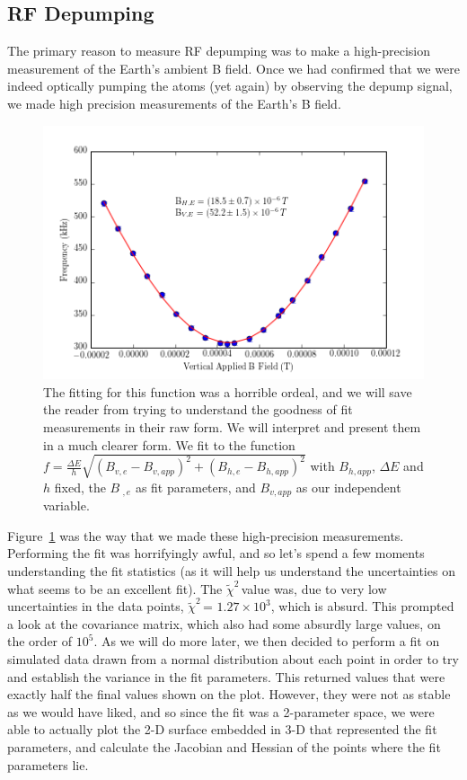\documentclass{article}
\newcommand{\redchi}{$\tilde{\chi}^2\,$}
\begin{document}
    \hspace{.25cm}

  \subsection{RF Depumping}
    The primary reason to measure RF depumping was to make a high-precision measurement of the Earth's ambient B field.  Once we had confirmed that we were indeed optically pumping the atoms (yet again) by observing the depump signal, we made high precision measurements of the Earth's B field.

    \begin{figure}[!htb]
      \centering
      \includegraphics[scale=.7]{../plots/earth_field.png}
      \caption{The fitting for this function was a horrible ordeal, and we will save the reader from trying to understand the goodness of fit measurements in their raw form.  We will interpret and present them in a much clearer form.  We fit to the function $f = \frac{\Delta E}{h}\sqrt{(B_{v,e} - B_{v,app})^2 + (B_{h,e} - B_{h,app})^2}$ with $B_{h,app}$, $\Delta E$ and $h$ fixed, the $B_{\,\,,e}$ as fit parameters, and $B_{v,app}$ as our independent variable.}
      \label{earth_field}
    \end{figure}

    Figure~\ref{earth_field} was the way that we made these high-precision measurements.  Performing the fit was horrifyingly awful, and so let's spend a few moments understanding the fit statistics (as it will help us understand the uncertainties on what seems to be an excellent fit).  The \redchi value was, due to very low uncertainties in the data points, \redchi = $1.27\times10^{3}$, which is absurd.  This prompted a look at the covariance matrix, which also had some absurdly large values, on the order of $10^5$.  As we will do more later, we then decided to perform a fit on simulated data drawn from a normal distribution about each point in order to try and establish the variance in the fit parameters.  This returned values that were exactly half the final values shown on the plot.  However, they were not as stable as we would have liked, and so since the fit was a 2-parameter space, we were able to actually plot the 2-D surface embedded in 3-D that represented the fit parameters, and calculate the Jacobian and Hessian of the points where the fit parameters lie.
\end{document}
